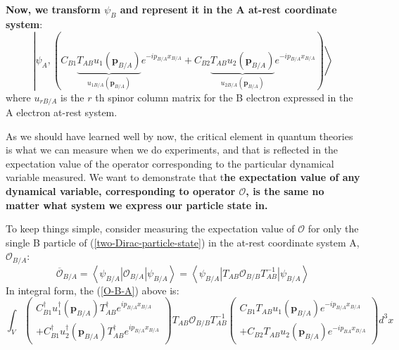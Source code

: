 \textbf{Now, we transform $\psi_B$ and represent it in the A at-rest coordinate system}:
\begin{equation}
\left|\psi_{A},\left(C_{B 1} \underbrace{T_{A B} u_{1}\left(\mathbf{p}_{B / A}\right)}_{u_{1 B / A}\left(\mathbf{p}_{B / A}\right)} e^{-i p_{B / A} x_{B / A}}+C_{B 2} \underbrace{T_{A B} u_{2}\left(\mathbf{p}_{B / A}\right)}_{u_{2 B / A}\left(\mathbf{p}_{B / A}\right)} e^{-i p_{B / A} x_{B / A}}\right)\right\rangle
\label{two-Dirac-particle-state}
\end{equation}
where $u_{r B / A}$ is the $r$ th spinor column matrix for the B electron expressed in the A electron at-rest system.

As we should have learned well by now, the critical element in quantum theories is what we can measure when we do experiments, and that is reflected in the expectation value of the operator corresponding to the particular dynamical variable measured. We want to demonstrate that t\textbf{he expectation value of any dynamical variable, corresponding to operator $\mathcal{O}$, is the same no matter what system we express our particle state in.}

To keep things simple, consider measuring the
expectation value of $\mathcal{O}$ for only the single B particle of (\ref{two-Dirac-particle-state}) in the at-rest coordinate system A, $\mathcal{O}_{B/A}$:
\begin{equation}
\overline{\mathcal{O}}_{B / A}=\left\langle\psi_{B / A}\left|\mathcal{O}_{B / A}\right| \psi_{B / A}\right\rangle=\left\langle\psi_{B / A}\left|T_{A B} \mathcal{O}_{B / B} T_{A B}^{-1}\right| \psi_{B / A}\right\rangle
\label{O-B-A}
\end{equation}
In integral form, the (\ref{O-B-A}) above is:
$$
\int_V\left(\begin{array}{c}
{C_{B 1}^{\dagger} u_{1}^{\dagger}\left(\mathbf{p}_{B / A}\right) T_{A B}^{\dagger} e^{i p_{B/A} x_{B/ A}}} \\
{+C_{B 1}^{\dagger} u_{2}^{\dagger}\left(\mathbf{p}_{B / A}\right)T^{\dagger}_{AB} e^{i p_{B/A} x_{B /A}}}
\end{array}\right)T_{A B} \mathcal{O}_{B / B} T_{A B}^{-1}\left(\begin{array}{l}
{C_{B 1} T_{A B} u_{1}\left(\mathbf{p}_{B / A}\right) e^{-i p_{B /A} x_{B / A}}} \\
{+C_{B 2} T_{A B} u_{2}\left(\mathbf{p}_{B / A}\right) e^{-i p_{B A} x_{B/A}}}
\end{array}\right)d^3x
$$

